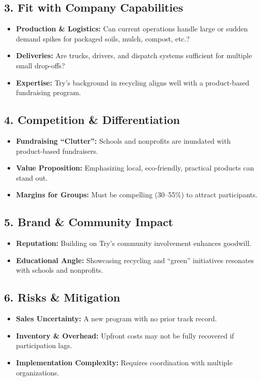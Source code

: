\documentclass[12pt]{article}
\begin{document}
\subsection*{3. Fit with Company Capabilities}
\begin{itemize}
    \item \textbf{Production \& Logistics:} Can current operations handle large or sudden demand spikes for packaged soils, mulch, compost, etc.?
    \item \textbf{Deliveries:} Are trucks, drivers, and dispatch systems sufficient for multiple small drop-offs?
    \item \textbf{Expertise:} Try’s background in recycling aligns well with a product-based fundraising program.
\end{itemize}

\subsection*{4. Competition \& Differentiation}
\begin{itemize}
    \item \textbf{Fundraising ``Clutter'':} Schools and nonprofits are inundated with product-based fundraisers.
    \item \textbf{Value Proposition:} Emphasizing local, eco-friendly, practical products can stand out.
    \item \textbf{Margins for Groups:} Must be compelling (30--55\%) to attract participants.
\end{itemize}

\subsection*{5. Brand \& Community Impact}
\begin{itemize}
    \item \textbf{Reputation:} Building on Try’s community involvement enhances goodwill.
    \item \textbf{Educational Angle:} Showcasing recycling and ``green'' initiatives resonates with schools and nonprofits.
\end{itemize}

\subsection*{6. Risks \& Mitigation}
\begin{itemize}
    \item \textbf{Sales Uncertainty:} A new program with no prior track record.
    \item \textbf{Inventory \& Overhead:} Upfront costs may not be fully recovered if participation lags.
    \item \textbf{Implementation Complexity:} Requires coordination with multiple organizations.
\end{itemize}
\end{document}
